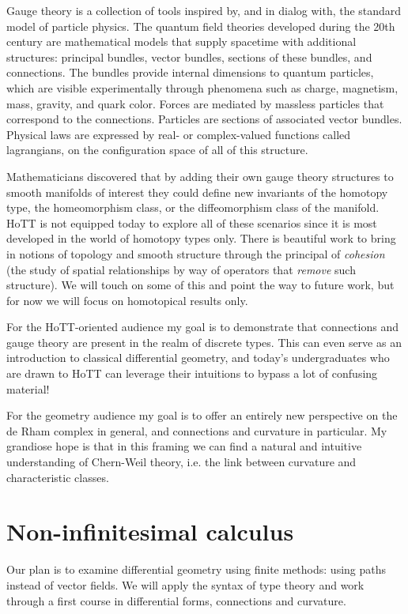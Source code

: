 \documentclass[12pt]{article}
\begin{document}
Gauge theory is a collection of tools inspired by, and in dialog with, the standard model of particle physics. The quantum field theories developed during the 20th century are mathematical models that supply spacetime with additional structures: principal bundles, vector bundles, sections of these bundles, and connections. The bundles provide internal dimensions to quantum particles, which are visible experimentally through phenomena such as charge, magnetism, mass, gravity, and quark color. Forces are mediated by massless particles that correspond to the connections. Particles are sections of associated vector bundles. Physical laws are expressed by real- or complex-valued functions called lagrangians, on the configuration space of all of this structure.

Mathematicians discovered that by adding their own gauge theory structures to smooth manifolds of interest they could define new invariants of the homotopy type, the homeomorphism class, or the diffeomorphism class of the manifold. HoTT is not equipped today to explore all of these scenarios since it is most developed in the world of homotopy types only. There is beautiful work to bring in notions of topology and smooth structure through the principal of \emph{cohesion} (the study of spatial relationships by way of operators that \emph{remove} such structure). We will touch on some of this and point the way to future work, but for now we will focus on homotopical results only. 

For the HoTT-oriented audience my goal is to demonstrate that connections and gauge theory are present in the realm of discrete types. This can even serve as an introduction to classical differential geometry, and today's undergraduates who are drawn to HoTT can leverage their intuitions to bypass a lot of confusing material!

For the geometry audience my goal is to offer an entirely new perspective on the de Rham complex in general, and connections and curvature in particular. My grandiose hope is that in this framing we can find a natural and intuitive understanding of Chern-Weil theory, i.e. the link between curvature and characteristic classes. 


\section{Non-infinitesimal calculus}

Our plan is to examine differential geometry using finite methods: using paths instead of vector fields. We will apply the syntax of type theory and work through a first course in differential forms, connections and curvature.
\end{document}
